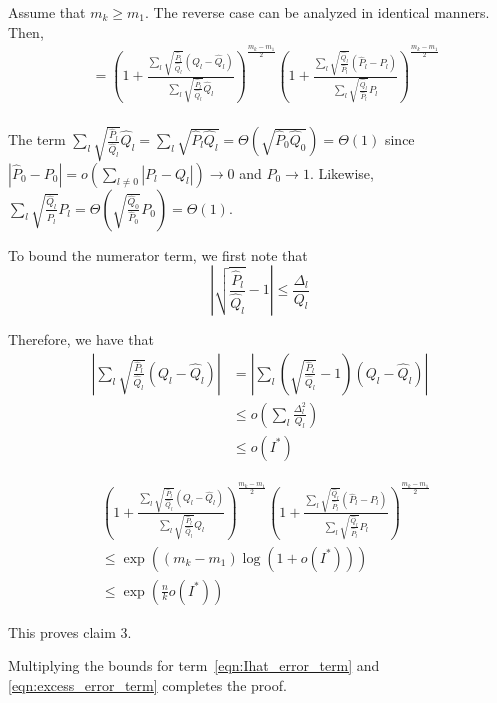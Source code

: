 \documentclass{article}
\begin{document}
Assume that $m_k \geq m_1$. The reverse case can be analyzed in identical manners. Then,
\begin{align*}
&= \left( 1 + 
   \frac{\sum_l \sqrt{\frac{\hat{P}_l}{\hat{Q}_l}} (Q_l - \hat{Q}_l)}
        {\sum_l \sqrt{\frac{\hat{P}_l}{\hat{Q}_l}} \hat{Q}_l} 
     \right)^{\frac{m_k - m_1}{2}} 
   \left( 1+ \frac{\sum_l \sqrt{\frac{\hat{Q}_l}{\hat{P}_l}} (\hat{P}_l - P_l)}
         {\sum_l \sqrt{\frac{\hat{Q}_l}{\hat{P}_l}} P_l } \right)^{\frac{m_k - m_1}{2}} 
   \\
\end{align*}

The term $\sum_l \sqrt{\frac{\hat{P}_l}{\hat{Q}_l}} \hat{Q}_l = \sum_l \sqrt{\hat{P}_l \hat{Q}_l} = \Theta( \sqrt{\hat{P}_0 \hat{Q}_0} ) =  \Theta(1)$ since $|\hat{P}_0 - P_0| = o( \sum_{l\neq 0} |P_l - Q_l|) \rightarrow 0$ and $P_0 \rightarrow 1$. Likewise, 
$\sum_l \sqrt{ \frac{\hat{Q}_l}{\hat{P}_l}} P_l 
  = \Theta \left( \sqrt{ \frac{\hat{Q}_0}{\hat{P}_0}} P_0 \right) =
  \Theta(1)$. 

To bound the numerator term, we first note that 
\[
\left| \sqrt{ \frac{\hat{P}_l}{\hat{Q}_l} } - 1 \right| \leq \frac{\Delta_l}{Q_l}
\]

Therefore, we have that
\begin{align*}
\left| \sum_l \sqrt{\frac{\hat{P}_l}{\hat{Q}_l}} (Q_l - \hat{Q}_l) \right|  &= 
  \left|  \sum_l \left( \sqrt{\frac{\hat{P}_l}{\hat{Q}_l}} -1 \right) (Q_l - \hat{Q}_l) 
 \right| \\
 &\leq o\left( \sum_l \frac{\Delta^2_l}{Q_l} \right) \\
& \leq o( I^*) 
\end{align*}

\begin{align*}
& \left( 1 + 
   \frac{\sum_l \sqrt{\frac{\hat{P}_l}{\hat{Q}_l}} (Q_l - \hat{Q}_l)}
        {\sum_l \sqrt{\frac{\hat{P}_l}{\hat{Q}_l}} \hat{Q}_l} 
     \right)^{\frac{m_k - m_1}{2}} 
   \left( 1+ \frac{\sum_l \sqrt{\frac{\hat{Q}_l}{\hat{P}_l}} (\hat{P}_l - P_l)}
         {\sum_l \sqrt{\frac{\hat{Q}_l}{\hat{P}_l}} P_l } \right)^{\frac{m_k - m_1}{2}} 
\\
&\leq \exp\left( (m_k - m_1) \log(1 + o(I^*) ) \right) \\
&\leq \exp \left( \frac{n}{k} o(I^*) \right) 
\end{align*}

This proves claim 3. 

Multiplying the bounds for term~\ref{eqn:Ihat_error_term} and \ref{eqn:excess_error_term} completes the proof. 
\end{document}
